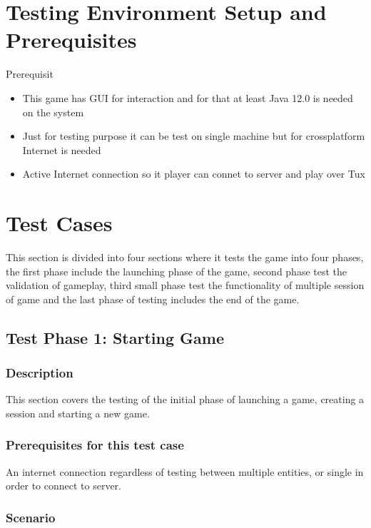 \documentclass{scrreprt}
\begin{document}
\chapter{Testing Environment Setup and Prerequisites}

Prerequisit
\begin{itemize}
  \item This game has GUI for interaction and for that at least Java 12.0 is needed on the system
  \item Just for testing purpose it can be test on single machine but for crossplatform Internet is needed
  \item Active Internet connection so it player can connet to server and play over Tux
\end{itemize}

\chapter{Test Cases}

This section is divided into four sections where it tests the game into four phases, the first phase include the launching phase of the game,
second phase test the validation of gameplay, third small phase test the functionality of multiple session of game and the last phase of testing includes the end of the game. 

\section{Test Phase 1: Starting Game}

\subsection{Description}
This section covers the testing of the initial phase of launching a game, creating a session and starting a new game.

\subsection{Prerequisites for this test case}
An internet connection regardless of testing between multiple entities, or single in order to connect to server.

\subsection{Scenario}
\end{document}
